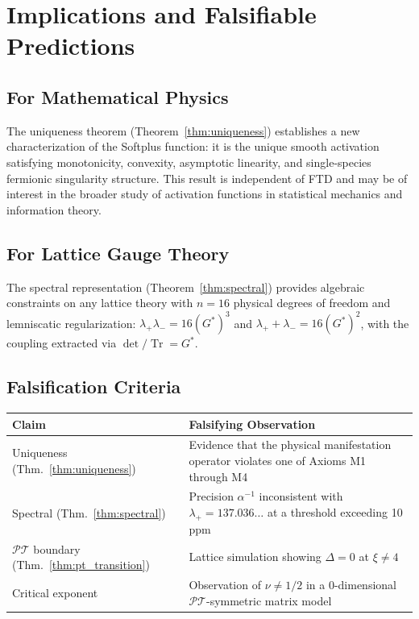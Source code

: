 \documentclass[12pt]{article}
\newcommand{\PT}{\mathcal{PT}}
\DeclareMathOperator{\Tr}{Tr}
\theoremstyle{definition}
\theoremstyle{remark}
\begin{document}
\section{Implications and Falsifiable Predictions}
\label{sec:predictions}

\subsection{For Mathematical Physics}

The uniqueness theorem (Theorem~\ref{thm:uniqueness}) establishes a new characterization of the Softplus function: it is the unique smooth activation satisfying monotonicity, convexity, asymptotic linearity, and single-species fermionic singularity structure. This result is independent of FTD and may be of interest in the broader study of activation functions in statistical mechanics and information theory.

\subsection{For Lattice Gauge Theory}

The spectral representation (Theorem~\ref{thm:spectral}) provides algebraic constraints on any lattice theory with $n = 16$ physical degrees of freedom and lemniscatic regularization: $\lambda_+\lambda_- = 16(G^{*})^3$ and $\lambda_+ + \lambda_- = 16(G^{*})^2$, with the coupling extracted via $\det/\Tr = G^{*}$.

\subsection{Falsification Criteria}

\begin{center}
\renewcommand{\arraystretch}{1.3}
\begin{tabular}{lp{8cm}}
\toprule
\textbf{Claim} & \textbf{Falsifying Observation} \\
\midrule
Uniqueness (Thm.~\ref{thm:uniqueness}) & Evidence that the physical manifestation operator violates one of Axioms M1 through M4 \\
Spectral (Thm.~\ref{thm:spectral}) & Precision $\alpha^{-1}$ inconsistent with $\lambda_+ = 137.036\ldots$ at a threshold exceeding 10 ppm \\
$\PT$ boundary (Thm.~\ref{thm:pt_transition}) & Lattice simulation showing $\Delta = 0$ at $\xi \neq 4$ \\
Critical exponent & Observation of $\nu \neq 1/2$ in a 0-dimensional $\PT$-symmetric matrix model \\
\bottomrule
\end{tabular}
\end{center}
\end{document}

